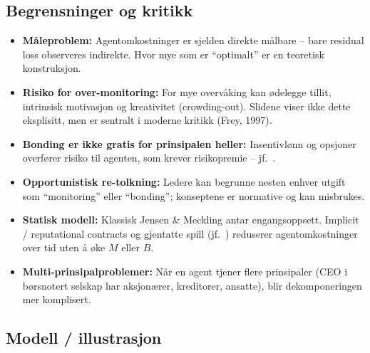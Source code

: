 \subsection*{Begrensninger og kritikk}
\begin{itemize}
\item \textbf{Måleproblem:} Agentomkostninger er sjelden direkte målbare -- bare residual loss observeres indirekte. Hvor mye som er ``optimalt'' er en teoretisk konstruksjon.
\item \textbf{Risiko for over-monitoring:} For mye overvåking kan ødelegge tillit, intrinsisk motivasjon og kreativitet (crowding-out). Slidene viser ikke dette eksplisitt, men er sentralt i moderne kritikk (Frey, 1997).
\item \textbf{Bonding er ikke gratis for prinsipalen heller:} Insentivlønn og opsjoner overfører risiko til agenten, som krever risikopremie -- jf.\ .
\item \textbf{Opportunistisk re-tolkning:} Ledere kan begrunne nesten enhver utgift som ``monitoring'' eller ``bonding''; konseptene er normative og kan misbrukes.
\item \textbf{Statisk modell:} Klassisk Jensen \& Meckling antar engangsoppsett. Implicit / reputational contracts og gjentatte spill (jf.\ ) reduserer agentomkostninger over tid uten å øke $M$ eller $B$.
\item \textbf{Multi-prinsipalproblemer:} Når en agent tjener flere prinsipaler (CEO i børsnotert selskap har aksjonærer, kreditorer, ansatte), blir dekomponeringen mer komplisert.
\end{itemize}

\subsection*{Modell / illustrasjon}

